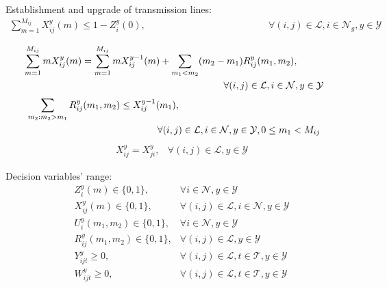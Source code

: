\documentclass{beamer}
\newcommand{\NN}{\mathcal{N}}
\begin{document}
\begin{frame}
\scriptsize Establishment and upgrade of transmission lines: \tiny
\begin{align}
	\sum_{m=1}^{M_{ij}}X_{ij}^y(m)\leq 1-Z^y_i(0) \label{FND:link_then_facility}, & \hspace{2in}\forall (i,j)\in\mathcal{L}, i\in \NN_g, y\in\mathcal{Y} %
\end{align}

\begin{align}
	& \sum_{m=1}^{M_{ij}}mX_{ij}^y(m)=\sum_{m=1}^{M_{ij}}mX_{ij}^{y-1}(m)+\sum_{m_1<m_2}(m_2-m_1)R_{ij}^y(m_1,m_2), & \notag \\
	& \hspace{2.9in} \forall (i,j)\in\mathcal{L}, i\in\NN, y\in\mathcal{Y} \label{FND:link_up} &
\end{align}
\begin{align}
  & \sum_{m_2: m_2>m_1}R_{ij}^y(m_1,m_2)\leq X_{ij}^{y-1}(m_1), & \notag\\
	& \hspace{1.9in} \forall (i,j)\in\mathcal{L}, i \in\NN, y\in\mathcal{Y}, 0\leq m_1<M_{ij} \label{FND:link_up2} & 
\end{align}
\begin{align}
	& X^y_{ij} = X^y_{ji} , \label{FND:edge_symm} &\forall (i,j)\in\mathcal{L}, y\in\mathcal{Y} %
\end{align}
\end{frame}

\begin{frame}
\small Decision variables' range: \tiny
\begin{align}
	 & Z^y_i(m) \in \{0,1\}, \label{FND:Z_int} &\forall i\in\NN, y\in\mathcal{Y}\\
	 & X^y_{ij}(m) \in \{0,1\}, &\forall (i,j)\in\mathcal{L}, i\in\NN, y\in\mathcal{Y}\\
	 & U_i^y(m_1, m_2)\in\{0,1\}, & \forall i\in\NN, y\in\mathcal{Y}\\
	 & R_{ij}^y(m_1, m_2)\in\{0,1\}, & \forall (i,j)\in\mathcal{L}, y\in\mathcal{Y}\\
	 & Y^y_{ijt}\geq0, &\forall (i,j)\in\mathcal{L}, t\in\mathcal{T}, y\in\mathcal{Y}\\
	 & W^y_{ijt}\geq0, \label{FND:W_pos} &\forall (i,j)\in\mathcal{L}, t\in\mathcal{T}, y\in\mathcal{Y}
\end{align}

\quad \\ \quad \\ \small
{}
\end{frame}
\end{document}
